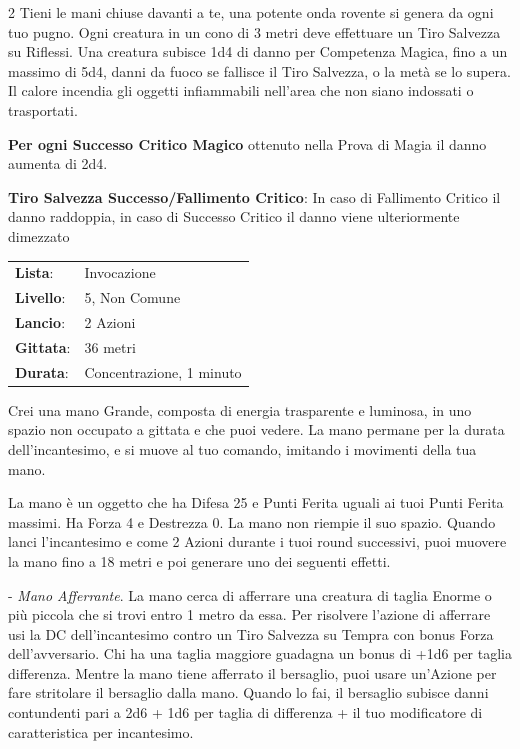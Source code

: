 \begin{multicols}{2}
Tieni le mani chiuse davanti a te, una potente onda rovente si genera da ogni tuo pugno. Ogni creatura in un cono di 3 metri deve effettuare un Tiro Salvezza su Riflessi. Una creatura subisce 1d4 di danno per Competenza Magica, fino a un massimo di 5d4, danni da fuoco se fallisce il Tiro Salvezza, o la metà se lo supera. Il calore incendia gli oggetti infiammabili nell'area che non siano indossati o trasportati.

\textbf{Per ogni Successo Critico Magico} ottenuto nella Prova di Magia il danno aumenta di 2d4.

\textbf{Tiro Salvezza Successo/Fallimento Critico}: In caso di Fallimento Critico il danno raddoppia, in caso di Successo Critico il danno viene ulteriormente dimezzato

\noindent\begin{tabularx}{\linewidth}{p{1.9cm}X}
	\rowcolor{gray!20}\textbf{Lista}: & Invocazione \\
	\textbf{Livello}: & 5, Non Comune \\
	\rowcolor{gray!20}\textbf{Lancio}: & 2 Azioni \\
	\textbf{Gittata}: & 36 metri \\
	\rowcolor{gray!20}\textbf{Durata}: & Concentrazione, 1 minuto \\
\end{tabularx}\smallskip

Crei una mano Grande, composta di energia trasparente e luminosa, in uno spazio non occupato a gittata e che puoi vedere. La mano permane per la durata dell'incantesimo, e si muove al tuo comando, imitando i movimenti della tua mano.

La mano è un oggetto che ha Difesa 25 e Punti Ferita uguali ai tuoi Punti Ferita massimi. Ha Forza 4 e Destrezza 0. La mano non riempie il suo spazio.
Quando lanci l'incantesimo e come 2 Azioni durante i tuoi round successivi, puoi muovere la mano fino a 18 metri e poi generare uno dei seguenti effetti.

\medskip

- \emph{Mano Afferrante}. La mano cerca di afferrare una creatura di taglia Enorme o più piccola che si trovi entro 1 metro da essa. Per risolvere l'azione di afferrare usi la DC dell'incantesimo contro un Tiro Salvezza su Tempra con bonus Forza dell'avversario.
Chi ha una taglia maggiore guadagna un bonus di +1d6 per taglia differenza.
Mentre la mano tiene afferrato il bersaglio, puoi usare un'Azione per fare stritolare il bersaglio dalla mano. Quando lo fai, il bersaglio subisce danni contundenti pari a 2d6 + 1d6 per taglia di differenza + il tuo modificatore di caratteristica per incantesimo.


\end{multicols}
